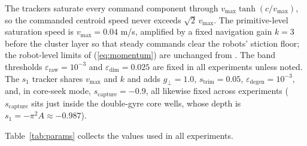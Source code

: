\documentclass[lettersize,journal]{IEEEtran}
\begin{document}
The trackers saturate every command component through $v_{\max}\tanh(c /
v_{\max})$, so the commanded centroid speed never exceeds
$\sqrt{2}\,v_{\max}$. The primitive-level saturation speed is $v_{\max}
= 0.04$ m/s, amplified by a fixed navigation gain $k = 3$ before the
cluster layer so that steady commands clear the robots' stiction floor;
the robot-level limits of (\ref{eq:momentum}) are unchanged from \cite{14}.
The band thresholds $\varepsilon_{\text{raw}} = 10^{-3}$ and
$\varepsilon_{\text{dim}} = 0.025$ are fixed in all experiments unless
noted. The $s_1$ tracker shares $v_{\max}$ and $k$ and adds $g_\perp =
1.0$, $s_{\text{trim}} = 0.05$, $\varepsilon_{\text{degen}} = 10^{-3}$,
and, in core-seek mode, $s_{\text{capture}} = -0.9$, all likewise fixed
across experiments ($s_{\text{capture}}$ sits just inside the
double-gyre core wells, whose depth is $s_1 = -\pi^2 A \approx
-0.987$).

Table~\ref{tab:params} collects the values used in all experiments.
\end{document}
